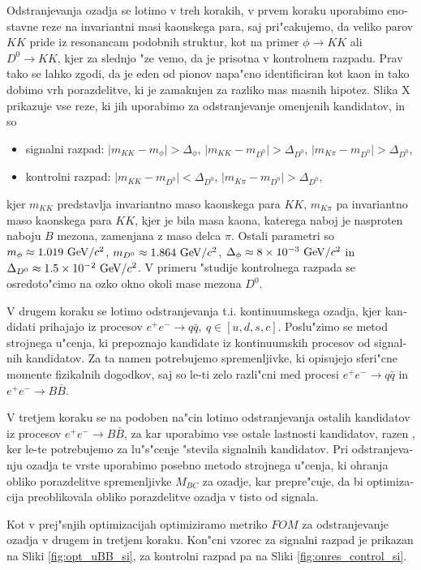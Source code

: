 \begin{otherlanguage}{slovene}
Odstranjevanja ozadja se lotimo v treh korakih, v prvem koraku uporabimo enostavne reze na invariantni masi kaonskega para, saj pri"cakujemo, da veliko parov $KK$ pride iz resonancam podobnih struktur, kot na primer $\phi \to KK$ ali $D^0 \to KK$, kjer za slednjo "ze vemo, da je prisotna v kontrolnem razpadu. Prav tako se lahko zgodi, da je eden od pionov napa"cno identificiran kot kaon in tako dobimo vrh porazdelitve, ki je zamaknjen za razliko mas masnih hipotez. Slika X prikazuje vse reze, ki jih uporabimo za odstranjevanje omenjenih kandidatov, in so
\begin{itemize}
\item signalni razpad: $\vert m_{KK} - m_{\phi} \vert > \Delta_\phi$, $\vert m_{KK} - m_{D^0} \vert > \Delta_{D^0}$, $\vert m_{K\pi} - m_{D^0} \vert > \Delta_{D^0}$,
\item kontrolni razpad: $\vert m_{KK} - m_{D^0} \vert < \Delta_{D^0}$, $\vert m_{K\pi} - m_{D^0} \vert > \Delta_{D^0}$,
\end{itemize}
kjer $m_{KK}$ predstavlja invariantno maso kaonskega para $KK$, $m_{K\pi}$ pa invariantno maso kaonskega para $KK$, kjer je bila masa kaona, katerega naboj je nasproten naboju $B$ mezona, zamenjana z maso delca $\pi$. Ostali parametri so $m_\phi \approx 1.019\mathrm{~GeV}/c^2$, $m_{D^0} \approx 1.864\mathrm{~GeV}/c^2$, $\Delta_\phi \approx 8\times 10^{-3}\mathrm{~GeV}/c^2$ in $\Delta_{D^0} \approx 1.5\times 10^{-2}\mathrm{~GeV}/c^2$. V primeru "studije kontrolnega razpada se osredoto"cimo na ozko okno okoli mase mezona $D^0$. 

V drugem koraku se lotimo odstranjevanja t.i. kontinuumskega ozadja, kjer kandidati prihajajo iz procesov $e^+e^- \to q \bar q,~q\in[u, d, s, c]$. Poslu"zimo se metod strojnega u"cenja, ki prepoznajo kandidate iz kontinuumskih procesov od signalnih kandidatov. Za ta namen potrebujemo spremenljivke, ki opisujejo sferi"cne momente fizikalnih dogodkov, saj so le-ti zelo razli"cni med procesi $e^+e^- \to q \bar q$ in $e^+e^- \to B \bar B$.

V tretjem koraku se na podoben na"cin lotimo odstranjevanja ostalih kandidatov iz procesov $e^+e^- \to B \bar B$, za kar uporabimo vse ostale lastnosti kandidatov, razen \varss, ker le-te potrebujemo za lu"s"cenje "stevila signalnih kandidatov. Pri odstranjevanju ozadja te vrste uporabimo posebno metodo strojnega u"cenja, ki ohranja obliko porazdelitve spremenljivke $M_{BC}$ za ozadje, kar prepre"cuje, da bi optimizacija preoblikovala obliko porazdelitve ozadja v tisto od signala.

Kot v prej"snjih optimizacijah optimiziramo metriko $FOM$ za odstranjevanje ozadja v drugem in tretjem koraku. Kon"cni vzorec za signalni razpad je prikazan na Sliki \ref{fig:opt_uBB_si}, za kontrolni razpad pa na Sliki \ref{fig:onres_control_si}.


\end{otherlanguage}
